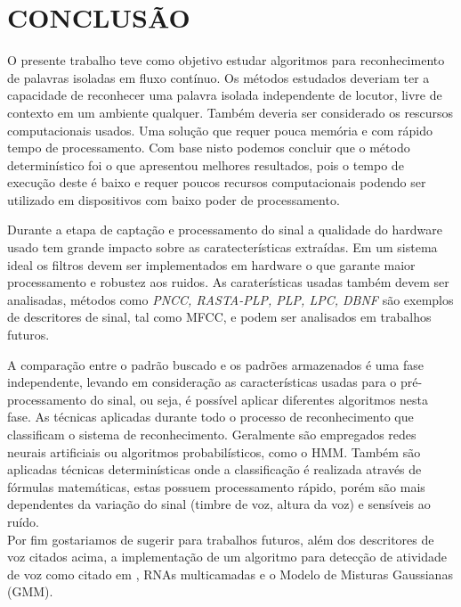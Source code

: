 \chapter{CONCLUSÃO}
\thispagestyle{plain}
\label{chap:conc}
\quad O presente trabalho teve como objetivo estudar algoritmos para reconhecimento de palavras isoladas em fluxo contínuo. Os métodos estudados deveriam ter a capacidade de reconhecer  uma palavra isolada independente de locutor, livre de contexto em um ambiente qualquer. Também deveria ser considerado os rescursos computacionais usados. Uma solução que requer pouca memória e com rápido tempo de processamento. Com base nisto podemos concluir que o método determinístico foi o que apresentou melhores resultados, pois o tempo de execução deste é baixo e requer poucos recursos computacionais podendo ser utilizado em
dispositivos com baixo poder de processamento.

\quad Durante a etapa de captação e processamento do sinal a qualidade do hardware usado tem grande impacto sobre as caratecterísticas extraídas. Em um sistema ideal os filtros devem ser implementados em hardware o que garante maior processamento e robustez aos ruidos. As caraterísticas usadas também devem ser analisadas, métodos como \textit{PNCC, RASTA-PLP, PLP, LPC, DBNF} são exemplos de descritores de sinal, tal como MFCC, e podem ser analisados em trabalhos futuros.

\quad A comparação entre o padrão buscado e os padrões armazenados é uma fase independente, levando em consideração as 
características usadas para o pré-processamento do sinal, ou seja, é possível aplicar diferentes algoritmos nesta fase. As técnicas 
aplicadas durante todo o processo de reconhecimento que classificam o sistema de reconhecimento. Geralmente são empregados redes neurais artificiais ou  algoritmos probabilísticos, como o HMM. Também são aplicadas técnicas determinísticas onde a  classificação é realizada através de  fórmulas matemáticas, estas possuem processamento rápido, porém são mais dependentes da variação do sinal (timbre de voz, altura da voz) e sensíveis ao ruído.\\

\quad Por fim gostariamos de sugerir para trabalhos futuros, além dos  descritores de voz citados acima, a implementação de um algoritmo para detecção de atividade de voz como citado em \cite{vad}, RNAs multicamadas e o Modelo de Misturas Gaussianas (GMM).